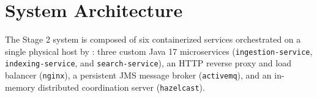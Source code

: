 \documentclass[10pt,a4paper]{article}
\begin{document}
\section{System Architecture}
\label{sec:architecture}

The Stage 2 system is composed of six containerized services orchestrated on a single physical host by : three custom Java 17 microservices (\texttt{ingestion-service}, \texttt{indexing-service}, and \texttt{search-service}), an HTTP reverse proxy and load balancer (\texttt{nginx}), a persistent JMS message broker (\texttt{activemq}), and an in-memory distributed coordination server (\texttt{hazelcast}).
\end{document}
